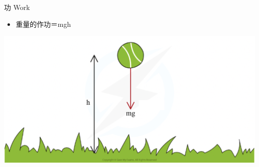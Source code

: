 \documentclass[beamer=true]{standalone}
\begin{document}
\begin{frame}{功 Work}
    \begin{itemize}
        \item 重量的作功＝mgh
    \end{itemize}

    {\par\centering
    \includegraphics[width=.8\textwidth]{assets/55ada19f.png}
    \par}
\end{frame}
\end{document}
